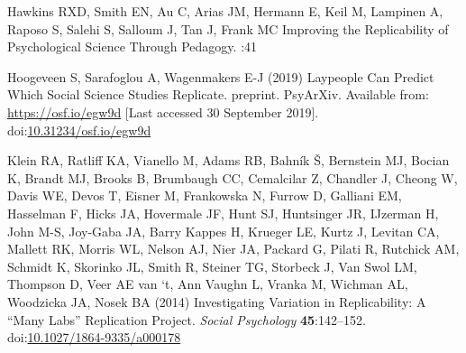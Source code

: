 \documentclass[
  english,
  a4paper,
]{article}
\newlength{\cslhangindent}
\newlength{\cslentryspacingunit} %
\newenvironment{CSLReferences}[2] %
 {%
  \setlength{\parindent}{0pt}
  \ifodd #1
  \let\oldpar\par
  \def\par{\hangindent=\cslhangindent\oldpar}
  \fi
  \setlength{\parskip}{#2\cslentryspacingunit}
 }%
 {}
\begin{document}
\begin{CSLReferences}{1}{0}
\leavevmode{}%
Hawkins RXD, Smith EN, Au C, Arias JM, Hermann E, Keil M, Lampinen A, Raposo S, Salehi S, Salloum J, Tan J, Frank MC Improving the {Replicability} of {Psychological Science Through Pedagogy}. :41

\leavevmode{}%
Hoogeveen S, Sarafoglou A, Wagenmakers E-J (2019) Laypeople {Can Predict Which Social Science Studies Replicate}. preprint. {PsyArXiv}. Available from: \url{https://osf.io/egw9d} {[}Last accessed 30 September 2019{]}. doi:\href{https://doi.org/10.31234/osf.io/egw9d}{10.31234/osf.io/egw9d}

\leavevmode{}%
Klein RA, Ratliff KA, Vianello M, Adams RB, Bahník Š, Bernstein MJ, Bocian K, Brandt MJ, Brooks B, Brumbaugh CC, Cemalcilar Z, Chandler J, Cheong W, Davis WE, Devos T, Eisner M, Frankowska N, Furrow D, Galliani EM, Hasselman F, Hicks JA, Hovermale JF, Hunt SJ, Huntsinger JR, IJzerman H, John M-S, Joy-Gaba JA, Barry Kappes H, Krueger LE, Kurtz J, Levitan CA, Mallett RK, Morris WL, Nelson AJ, Nier JA, Packard G, Pilati R, Rutchick AM, Schmidt K, Skorinko JL, Smith R, Steiner TG, Storbeck J, Van Swol LM, Thompson D, Veer AE van `t, Ann Vaughn L, Vranka M, Wichman AL, Woodzicka JA, Nosek BA (2014) Investigating {Variation} in {Replicability}: {A} {``{Many Labs}''} {Replication Project}. \emph{Social Psychology} \textbf{45}:142--152. doi:\href{https://doi.org/10.1027/1864-9335/a000178}{10.1027/1864-9335/a000178}


\end{CSLReferences}
\end{document}
